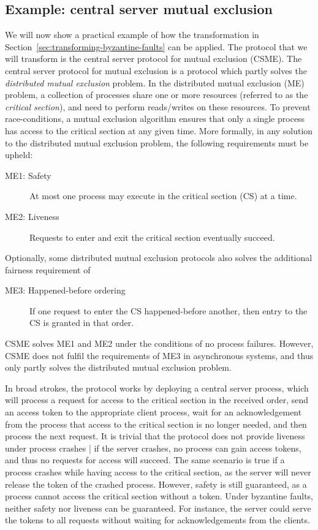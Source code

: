 \documentclass{article}
\begin{document}
		\subsection{Example: central server mutual exclusion}

		We will now show a practical example of how the transformation in Section~\ref{sec:transforming-byzantine-faults} can be applied.
		The protocol that we will transform is the central server protocol for mutual exclusion (CSME).
		The central server protocol for mutual exclusion is a protocol which partly solves the \textit{distributed mutual exclusion} problem.
		In the distributed mutual exclusion (ME) problem, a collection of processes share one or more resources (referred to as the \textit{critical section}), and need to perform reads/writes on these resources.
		To prevent race-conditions, a mutual exclusion algorithm ensures that only a single process has access to the critical section at any given time.
		More formally, in any solution to the distributed mutual exclusion problem, the following requirements must be upheld:
		\begin{description}
			\item[ME1: Safety] At most one process may execute in the critical section (CS) at a time.
			\item[ME2: Liveness] Requests to enter and exit the critical section eventually succeed.
		\end{description}
		Optionally, some distributed mutual exclusion protocols also solves the additional fairness requirement of
		\begin{description}
			\item[ME3: Happened-before ordering] If one request to enter the CS happened-before another, then entry to the CS is granted in that order.
		\end{description}
		CSME solves ME1 and ME2 under the conditions of no process failures.
		However, CSME does not fulfil the requirements of ME3 in asynchronous systems, and thus only partly solves the distributed mutual exclusion problem.

		In broad strokes, the protocol works by deploying a central server process, which will process a request for access to the critical section in the received order, send an access token to the appropriate client process, wait for an acknowledgement from the process that access to the critical section is no longer needed, and then process the next request.
		It is trivial that the protocol does not provide liveness under process crashes | if the server crashes, no process can gain access tokens, and thus no requests for access will succeed.
		The same scenario is true if a process crashes while having access to the critical section, as the server will never release the token of the crashed process.
		However, safety is still guaranteed, as a process cannot access the critical section without a token.
		Under byzantine faults, neither safety nor liveness can be guaranteed.
		For instance, the server could serve the tokens to all requests without waiting for acknowledgements from the clients.
\end{document}
